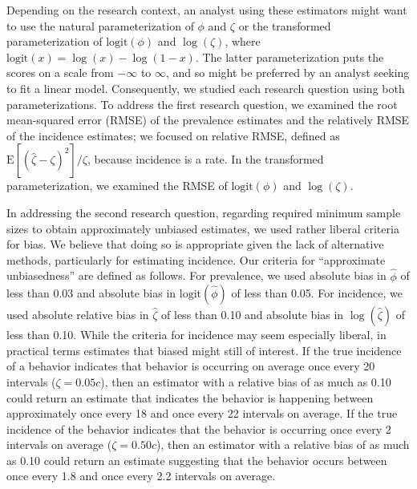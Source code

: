 \documentclass[man, noextraspace, floatsintext]{apa6}\usepackage[]{graphicx}\usepackage[]{color}
\newcommand{\E}{\text{E}}
\newcommand{\logit}{\text{logit}}
\begin{document}
Depending on the research context, an analyst using these estimators might want to use the natural parameterization of $\phi$ and $\zeta$ or the transformed parameterization of $\logit(\phi)$ and $\log(\zeta)$, where $\logit(x) = \log(x) - \log (1 - x)$. 
The latter parameterization puts the scores on a scale from $-\infty$ to $\infty$, and so might be preferred by an analyst seeking to fit a linear model. 
Consequently, we studied each research question using both parameterizations. 
To address the first research question, we examined the root mean-squared error (RMSE) of the prevalence estimates and the relatively RMSE of the incidence estimates; we focused on relative RMSE, defined as $\E\left[\left(\hat\zeta - \zeta\right)^2\right] / \zeta$, because incidence is a rate. 
In the transformed parameterization, we examined the RMSE of $\logit(\phi)$ and $\log(\zeta)$.  

In addressing the second research question, regarding required minimum sample sizes to obtain approximately unbiased estimates, we used rather liberal criteria for bias. 
We believe that doing so is appropriate given the lack of alternative methods, particularly for estimating incidence. 
Our criteria for ``approximate unbiasedness'' are defined as follows. 
For prevalence, we used absolute bias in $\hat\phi$ of less than 0.03 and absolute bias in $\logit(\hat\phi)$ of less than 0.05. 
For incidence, we used absolute relative bias in $\hat\zeta$ of less than 0.10 and absolute bias in $\log(\hat\zeta)$ of less than 0.10. While the criteria for incidence may seem especially liberal, in practical terms estimates that biased might still of interest. If the true incidence of a behavior indicates that behavior is occurring on average once every 20 intervals ($\zeta = 0.05c$), then an estimator with a relative bias of as much as 0.10 could return an estimate that indicates the behavior is happening between approximately once every 18 and once every 22 intervals on average. If the true incidence of the behavior indicates that the behavior is occurring once every 2 intervals on average ($\zeta = 0.50c$), then an estimator with a relative bias of as much as 0.10 could return an estimate suggesting that the behavior occurs between once every 1.8 and once every 2.2 intervals on average.  
\end{document}
